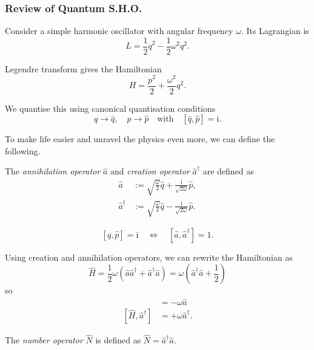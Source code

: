 \documentclass[a4paper,11pt]{article}
\begin{document}
	\subsubsection{Review of Quantum S.H.O.}

	Consider a simple harmonic oscillator with angular frequency $\omega$. Its Lagrangian is
	\[
		L = \frac{1}{2} \dot q^2 - \frac{1}{2} \omega^2 q^2.
	\]
	
	Legendre transform gives the Hamiltonian
	\[
		H = \frac{p^2}{2} + \frac{\omega^2}{2}q^2.
	\]
	
	We quantise this using canonical quantisation conditions
	\[
		q \to \hat q, \quad p \to \hat p \quad \text{with} \quad [\hat q,\hat p]= \mathrm{i}.
	\]
	
	To make life easier and unravel the physics even more, we can define the following.
	
	\begin{defi}
		The \emph{annihilation operator} $\hat a$ and \emph{creation operator} $\hat a^\dagger$ are defined as
		\begin{align*}
			\hat a & := \sqrt{\frac{\omega}{2}} \hat q + \frac{\mathrm{i}}{\sqrt{2 \omega}} \hat p,\\
			\hat a^\dagger & := \sqrt{\frac{\omega}{2}} \hat q - \frac{\mathrm{i}}{\sqrt{2 \omega}} \hat p.
		\end{align*}
	\end{defi}

	\begin{prop}
		\[
			[\hat q, \hat p] = \mathrm{i} \quad \Leftrightarrow \quad [\hat a,\hat a^\dagger] = 1.
		\]
	\end{prop}

	\begin{prop}
		Using creation and annihilation operators, we can rewrite the Hamiltonian as
		\[
			\hat H = \frac{1}{2} \omega (\hat a \hat a^\dagger + \hat a^\dagger \hat a) = \omega \left(\hat a^\dagger \hat a + \frac{1}{2}\right)
		\]
		so
		\begin{align*}
			[\hat H, \hat a] & = - \omega \hat a\\
			[\hat H, \hat a^\dagger] & = + \omega \hat a^\dagger.
		\end{align*}
	\end{prop}

	\begin{defi}
		The \emph{number operator} $\hat N$ is defined as $\hat N = \hat a^\dagger \hat a$.
	\end{defi}
\end{document}
